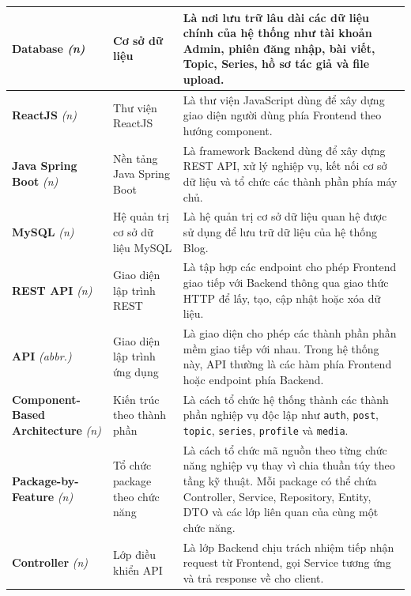 \documentclass[a4paper,12pt]{article}
\begin{document}
\begin{longtable}{|p{3.5cm}|p{3.5cm}|p{8cm}|}
\textbf{Database} \textit{(n)} & Cơ sở dữ liệu & Là nơi lưu trữ lâu dài các dữ liệu chính của hệ thống như tài khoản Admin, phiên đăng nhập, bài viết, Topic, Series, hồ sơ tác giả và file upload. \\
\hline

\textbf{ReactJS} \textit{(n)} & Thư viện ReactJS & Là thư viện JavaScript dùng để xây dựng giao diện người dùng phía Frontend theo hướng component. \\
\hline

\textbf{Java Spring Boot} \textit{(n)} & Nền tảng Java Spring Boot & Là framework Backend dùng để xây dựng REST API, xử lý nghiệp vụ, kết nối cơ sở dữ liệu và tổ chức các thành phần phía máy chủ. \\
\hline

\textbf{MySQL} \textit{(n)} & Hệ quản trị cơ sở dữ liệu MySQL & Là hệ quản trị cơ sở dữ liệu quan hệ được sử dụng để lưu trữ dữ liệu của hệ thống Blog. \\
\hline

\textbf{REST API} \textit{(n)} & Giao diện lập trình REST & Là tập hợp các endpoint cho phép Frontend giao tiếp với Backend thông qua giao thức HTTP để lấy, tạo, cập nhật hoặc xóa dữ liệu. \\
\hline

\textbf{API} \textit{(abbr.)} & Giao diện lập trình ứng dụng & Là giao diện cho phép các thành phần phần mềm giao tiếp với nhau. Trong hệ thống này, API thường là các hàm phía Frontend hoặc endpoint phía Backend. \\
\hline

\textbf{Component-Based Architecture} \textit{(n)} & Kiến trúc theo thành phần & Là cách tổ chức hệ thống thành các thành phần nghiệp vụ độc lập như \texttt{auth}, \texttt{post}, \texttt{topic}, \texttt{series}, \texttt{profile} và \texttt{media}. \\
\hline

\textbf{Package-by-Feature} \textit{(n)} & Tổ chức package theo chức năng & Là cách tổ chức mã nguồn theo từng chức năng nghiệp vụ thay vì chia thuần túy theo tầng kỹ thuật. Mỗi package có thể chứa Controller, Service, Repository, Entity, DTO và các lớp liên quan của cùng một chức năng. \\
\hline

\textbf{Controller} \textit{(n)} & Lớp điều khiển API & Là lớp Backend chịu trách nhiệm tiếp nhận request từ Frontend, gọi Service tương ứng và trả response về cho client. \\
\hline


\end{longtable}
\end{document}
